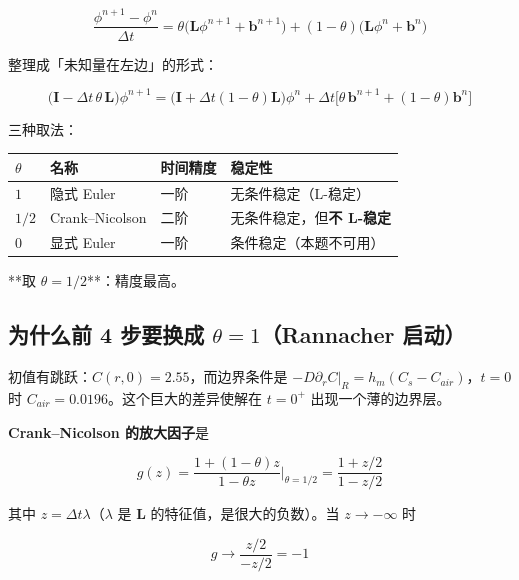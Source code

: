 \begin{equation}
\frac{\phi^{n+1}-\phi^{n}}{\Delta t}
=\theta\big(\mathbf L\phi^{n+1}+\mathbf b^{n+1}\big)+(1-\theta)\big(\mathbf L\phi^{n}+\mathbf b^{n}\big)\tag{8.1}
\end{equation}


整理成「未知量在左边」的形式：


\begin{equation}
\boxed{\ \Big(\mathbf I-\Delta t\,\theta\,\mathbf L\Big)\phi^{n+1}
=\Big(\mathbf I+\Delta t(1-\theta)\mathbf L\Big)\phi^{n}
+\Delta t\Big[\theta\,\mathbf b^{n+1}+(1-\theta)\mathbf b^{n}\Big]\ }\tag{8.2}
\end{equation}


三种取法：


\begin{center}
\small
\begin{tabular}{llll}
\toprule
$\theta$ & 名称 & 时间精度 & 稳定性 \\
\midrule
$1$ & 隐式 Euler & 一阶 & 无条件稳定（L-稳定） \\
$1/2$ & Crank–Nicolson & 二阶 & 无条件稳定，但\textbf{不 L-稳定} \\
$0$ & 显式 Euler & 一阶 & 条件稳定（本题不可用） \\
\bottomrule
\end{tabular}
\end{center}


**取 $\theta=1/2$**：精度最高。


\subsection{为什么前 4 步要换成 $\theta=1$（Rannacher 启动）}


初值有跳跃：$C(r,0)=2.55$，而边界条件是 $-D\partial_rC|_R=h_m(C_s-C_{air})$，$t=0$ 时 $C_{air}=0.0196$。这个巨大的差异使解在 $t=0^+$ 出现一个薄的边界层。


\textbf{Crank–Nicolson 的放大因子}是


\begin{equation*}
g(z)=\frac{1+(1-\theta)z}{1-\theta z}\Big|_{\theta=1/2}=\frac{1+z/2}{1-z/2}
\end{equation*}


其中 $z=\Delta t\lambda$（$\lambda$ 是 $\mathbf L$ 的特征值，是很大的负数）。当 $z\to-\infty$ 时


\begin{equation*}
g\to\frac{z/2}{-z/2}=-1
\end{equation*}


